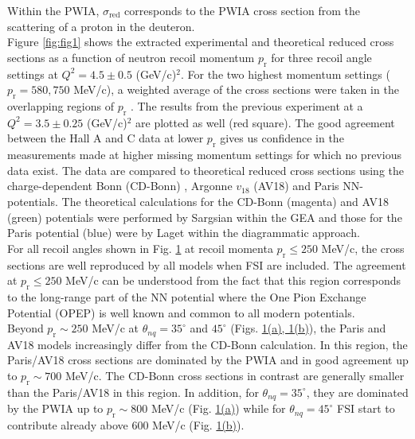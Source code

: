 Within the PWIA, $\sigma_{\mathrm{red}}$ corresponds to the PWIA cross section from the scattering of a proton in the deuteron. \\
\indent Figure \ref{fig:fig1} shows the extracted experimental and theoretical reduced cross sections as a function of neutron recoil momentum
$p_{\mathrm{r}}$ for three recoil angle settings at $Q^{2}=4.5\pm0.5$ (GeV/c)$^{2}$. For the two highest momentum settings ($p_{\mathrm{r}}=580, 750$ MeV/c), a weighted average of the cross sections were taken in the overlapping regions of $p_{\mathrm{r}}$ . The results from the previous experiment \cite{PhysRevLett.107.262501} at a $Q^{2}=3.5\pm0.25$ (GeV/c)$^{2}$ are plotted as well (red square). The good agreement between the Hall A and C data at lower $p_{\mathrm{r}}$
gives us confidence in the measurements made at higher missing momentum settings for which no previous data exist.
The data are compared to theoretical reduced
cross sections using the charge-dependent Bonn (CD-Bonn) \cite{PhysRevC.63.024001}, Argonne $v_{18}$ (AV18) \cite{PhysRevC.51.38} and Paris \cite{PhysRevC.21.861} NN-potentials. The theoretical calculations
for the CD-Bonn (magenta) and AV18 (green) potentials were performed by Sargsian \cite{PhysRevC.82.014612} within the GEA and those for the Paris potential (blue) were by Laget \cite{LAGET2005} within the diagrammatic approach.\\
\indent For all recoil angles shown in Fig. \hyperref[fig:fig1]{1} at recoil momenta $p_{\mathrm{r}}\leq250$ MeV/c, the cross sections are well reproduced by all models when FSI are included.
The agreement at $p_{\mathrm{r}}\leq250$ MeV/c can be understood from the fact that this region corresponds to the long-range part of the NN potential where the One Pion Exchange Potential (OPEP)
is well known and common to all modern potentials. \\
\indent Beyond $p_{\mathrm{r}}\sim250$ MeV/c at $\theta_{nq}=35^{\circ}$ and $45^{\circ}$ (Figs. \hyperref[fig:fig1]{1(a), 1(b)}), the Paris and
AV18 models increasingly differ from the CD-Bonn calculation. In this region, the Paris/AV18 cross sections are dominated by the PWIA and in good agreement up to $p_{\mathrm{r}}\sim700$ MeV/c. The CD-Bonn cross sections in contrast are generally smaller than the Paris/AV18 in this region.  In addition, for $\theta_{nq}=35^{\circ}$, they are dominated by the PWIA up to $p_{\mathrm{r}}\sim800$ MeV/c (Fig. \hyperref[fig:fig1]{1(a)})  while for $\theta_{nq}=45^{\circ}$  FSI start to contribute already above 600 MeV/c (Fig. \hyperref[fig:fig1]{1(b)}).\\
